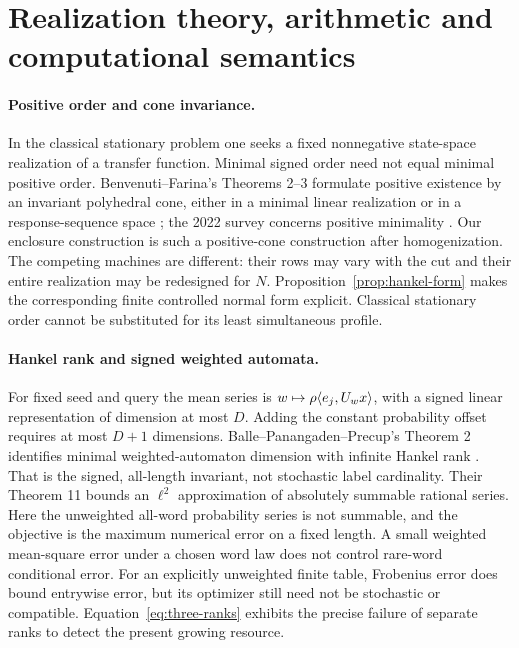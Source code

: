 \section{Realization theory, arithmetic and computational semantics}\label{sec:comparison}
\paragraph{Positive order and cone invariance.}
In the classical stationary problem one seeks a fixed nonnegative
state-space realization of a transfer function. Minimal signed order
need not equal minimal positive order. Benvenuti--Farina's Theorems
2--3 formulate positive existence by an invariant polyhedral cone,
either in a minimal linear realization or in a response-sequence space
\cite{BF04}; the 2022 survey concerns positive minimality \cite{Ben22}.
Our enclosure construction is such a positive-cone construction after
homogenization. The competing machines are different: their rows may
vary with the cut and their entire realization may be redesigned for
$N$. Proposition~\ref{prop:hankel-form} makes the corresponding finite
controlled normal form explicit. Classical stationary order cannot
be substituted for its least simultaneous profile.

\paragraph{Hankel rank and signed weighted automata.}
For fixed seed and query the mean series is
$w\mapsto\rho\langle e_j,U_wx\rangle$, with a signed linear representation of
dimension at most $D$. Adding the constant probability offset requires
at most $D+1$ dimensions. Balle--Panangaden--Precup's Theorem 2 identifies
minimal weighted-automaton dimension with infinite Hankel rank
\cite{BPP15}. That is the signed, all-length invariant, not stochastic
label cardinality. Their Theorem 11 bounds an $\ell^2$ approximation
of absolutely summable rational series. Here the unweighted all-word
probability series is not summable, and the objective is the maximum
numerical error on a fixed length. A small weighted mean-square error
under a chosen word law does not control rare-word conditional error.
For an explicitly unweighted finite table, Frobenius error does bound
entrywise error, but its optimizer still need not be stochastic or
compatible. Equation~\eqref{eq:three-ranks} exhibits the precise failure
of separate ranks to detect the present growing resource.

